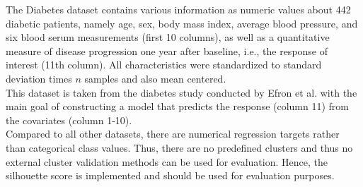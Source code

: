 The Diabetes dataset contains various information as numeric values about 442 diabetic patients, namely age, sex, body mass index, average blood pressure, and six blood serum measurements (first 10 columns), as well as a quantitative measure of disease progression one year after baseline, i.e., the response of interest (11th column). All characteristics were standardized to standard deviation times $n$ samples and also mean centered.\\
This dataset is taken from the diabetes study conducted by Efron et al. \cite{diabetes} with the main goal of constructing a model that predicts the response (column 11) from the covariates (column 1-10).\\
Compared to all other datasets, there are numerical regression targets rather than categorical class values. Thus, there are no predefined clusters and thus no external cluster validation methods can be used for evaluation. Hence, the silhouette score is implemented and should be used for evaluation purposes.
